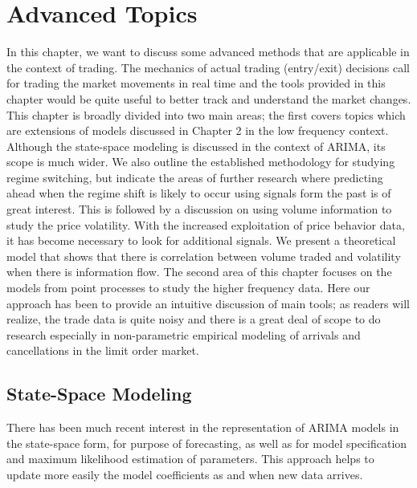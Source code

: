 \chapter{Advanced Topics \label{ch:ch_advanced}}

In this chapter, we want to discuss some advanced methods that are applicable in the context of trading. The mechanics of actual trading (entry/exit) decisions call for trading the market movements in real time and the tools provided in this chapter would be quite useful to better track and understand the market changes. This chapter is broadly divided into two main areas; the first covers topics which are extensions of models discussed in Chapter 2 in the low frequency context. Although the state-space modeling is discussed in the context of ARIMA, its scope is much wider. We also outline the established methodology for studying regime switching, but indicate the areas of further research where predicting ahead when the regime shift is likely to occur using signals form the past is of great interest. This is followed by a discussion on using volume information to study the price volatility. With the increased exploitation of price behavior data, it has become necessary to look for additional signals. We present a theoretical model that shows that there is correlation between volume traded and volatility when there is information flow. The second area of this chapter focuses on the models from point processes to study the higher frequency data. Here our approach has been to provide an intuitive discussion of main tools; as readers will realize, the trade data is quite noisy and there is a great deal of scope to do research especially in non-parametric empirical modeling of arrivals and cancellations in the limit order market. 



\section{State-Space Modeling} 


There has been much recent interest in the representation of ARIMA models in the state-space form, for purpose of forecasting, as well as for model specification and maximum likelihood estimation of parameters. This approach helps to update more easily the model coefficients as and when new data arrives. 


